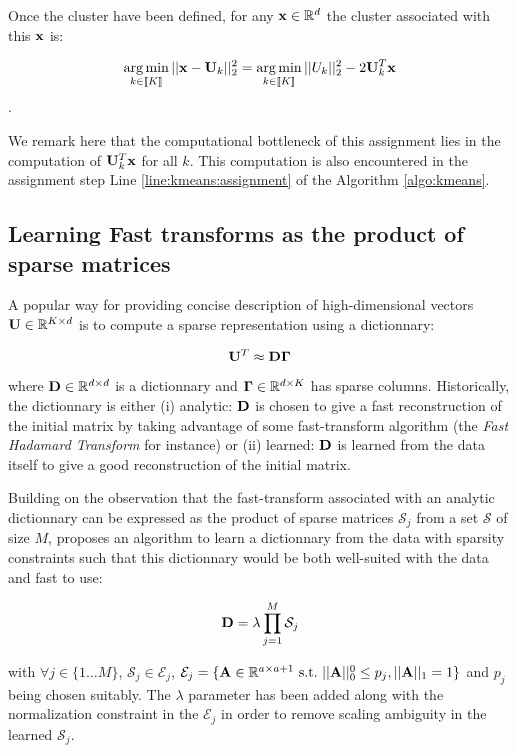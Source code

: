 Once the cluster have been defined, for any ${\mathbf{x}} \in \mathbb{R}^d$ the cluster associated with this ${\mathbf{x}}$ is:

\begin{equation}
\label{eq:assignment_problem_kmeans}
\operatorname*{arg\,min}_{k \in [\![K]\!]} ||{\mathbf{x}} - {\mathbf{U}}_{k}||_2^2 = \operatorname*{arg\,min}_{k \in [\![K]\!]} ||U_k||_2^2 - 2 {\mathbf{U}}_{k}^T{\mathbf{x}}
\end{equation}.


We remark here that the computational bottleneck of this assignment lies in the computation of ${\mathbf{U}}_k^T{\mathbf{x}}$ for all $k$. This computation is also encountered in the assignment step Line \ref{line:kmeans:assignment} of the Algorithm \ref{algo:kmeans}.


\subsection{Learning Fast transforms as the product of sparse matrices}

A popular way for providing concise description of high-dimensional vectors ${\mathbf{U}} \in \mathbb{R}^{K \times d}$ is to compute a sparse representation using a dictionnary:

\begin{equation}
{\mathbf{U}}^T \approx {\mathbf{D}}{\mathbf{\Gamma}}
\end{equation}

where ${\mathbf{D}} \in \mathbb{R}^{d \times d}$ is a dictionnary and ${\mathbf{\Gamma}} \in \mathbb{R}^{d \times K}$ has sparse columns. Historically, the dictionnary is either (i) analytic: ${\mathbf{D}}$ is chosen to give a fast reconstruction of the initial matrix by taking advantage of some fast-transform algorithm (the \textit{Fast Hadamard Transform} for instance) or (ii) learned: ${\mathbf{D}}$ is learned from the data itself to give a good reconstruction of the initial matrix.

Building on the observation that the fast-transform associated with an analytic dictionnary can be expressed as the product of sparse matrices $\mathcal{S}_j$ from a set $\mathcal{S}$ of size $M$, \cite{magoarou2014learning} proposes an algorithm to learn a dictionnary from the data with sparsity constraints such that this dictionnary would be both well-suited with the data and fast to use:

\begin{equation}
{\mathbf{D}} = \lambda \prod_{j=1}^{M}\mathcal{S}_j
\end{equation}

with $\forall j \in \{1 \ldots M\}$, $\mathcal{S}_j \in \mathcal{E}_j$, $\mathcal{E}_j = \lbrace {\mathbf{A}} \in \mathbb{R}^{a \times a+1}~\text{s.t.}~||{\mathbf{A}}||_0^0 \leq p_j, ||{\mathbf{A}}||_1 = 1 \rbrace$ and $p_j$ being chosen suitably. The $\lambda$ parameter has been added along with the normalization constraint in the $\mathcal{E}_j$ in order to remove scaling ambiguity in the learned $\mathcal{S}_j$.

